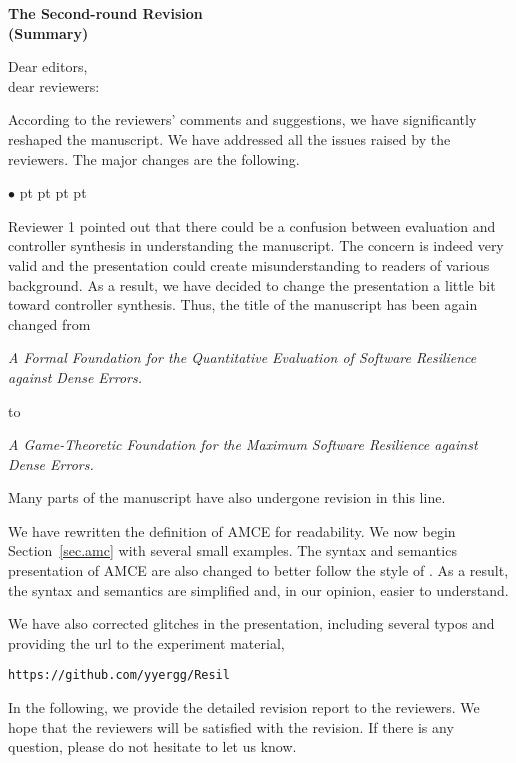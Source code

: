 \documentclass[times,10pt,twocolumn]{article}
\newenvironment{list1}{\begin{list}{$\bullet$}
{\topsep 0 pt \parsep 0 pt \partopsep 0 pt \itemsep 0
pt}}{\end{list}}
\begin{document}
   



% 




\newpage
\onecolumn 
\begingroup
\appendix 
\begin{center} 
\bf\LARGE The Second-round Revision \\
(Summary) 
\end{center} 
Dear editors,\\
dear reviewers: 

According to the reviewers' comments and suggestions, 
we have significantly reshaped the manuscript.  
We have addressed all the issues raised by the reviewers.  
The major changes are the following. 
\begin{list1} 
\item Reviewer 1 pointed out that there could be a confusion between 
    evaluation and controller synthesis in understanding the manuscript. 
    The concern is indeed very valid and 
    the presentation could create misunderstanding to readers of 
    various background. 
    As a result, we have decided to change the presentation a little bit toward 
    controller synthesis.  
    Thus, the title of the manuscript has been again changed from 
	\begin{center} \em 
	A Formal Foundation for the Quantitative Evaluation of Software Resilience against Dense Errors.
	\end{center} 
	to 
	\begin{center} \em 
	A Game-Theoretic Foundation for the Maximum Software Resilience against Dense Errors.
	\end{center} 
	Many parts of the manuscript have also undergone revision in this line. 
\item We have rewritten the definition of AMCE for readability. 
    We now begin Section~\ref{sec.amc} with several small examples. 
    The syntax and semantics presentation of AMCE are also changed 
	to better follow the style of \cite{AHK02}. 
	As a result, the syntax and semantics are simplified and, 
	in our opinion, easier to understand.  
\item We have also corrected glitches in the presentation, 
    including several typos and providing the url to the experiment material,
\begin{center}
\verb+https://github.com/yyergg/Resil+
\end{center} 
\end{list1} 
In the following, we provide the detailed revision report to the reviewers.  
We hope that the reviewers will be satisfied with the revision.  
If there is any question, please do not hesitate to let us know. 
\end{document}
